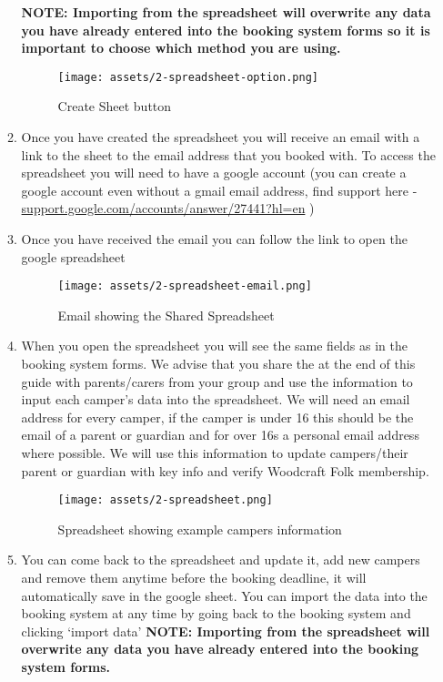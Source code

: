 \documentclass[a4paper, 11pt]{report}
\begin{document}
\begin{enumerate}
\begin{enumerate}
        \textbf{NOTE: Importing from the spreadsheet will overwrite any data you have already entered into the booking system forms so it is important to choose which method you are using.}
        \begin{figure}[H]
            \centering
            \texttt{[image: assets/2-spreadsheet-option.png]}
            \caption{Create Sheet button}
        \end{figure}
        \item Once you have created the spreadsheet you will receive an email with a link to the sheet to the email address that you booked with. To access the spreadsheet you will need to have a google account (you can create a google account even without a gmail email address, find support here - \href{https://support.google.com/accounts/answer/27441?hl=en}{support.google.com/accounts/answer/27441?hl=en} ) 
        \item Once you have received the email you can follow the link to open the google spreadsheet
         \begin{figure}[H]
            \centering
            \texttt{[image: assets/2-spreadsheet-email.png]}
            \caption{Email showing the Shared Spreadsheet}
        \end{figure}
        \item When you open the spreadsheet you will see the same fields as in the booking system forms. We advise that you share the  at the end of this guide with parents/carers from your group and use the information to input each camper's data into the spreadsheet. We will need an email address for every camper, if the camper is under 16 this should be the email of a parent or guardian and for over 16s a personal email address where possible. We will use this information to update campers/their parent or guardian with key info and verify Woodcraft Folk membership.
        \begin{figure}[H]
            \centering
            \texttt{[image: assets/2-spreadsheet.png]}
            \caption{Spreadsheet showing example campers information}
        \end{figure}
        \item You can come back to the spreadsheet and update it, add new campers and remove them anytime before the booking deadline, it will automatically save in the google sheet. You can import the data into the booking system at any time by going back to the booking system and clicking `import data' \textbf{NOTE: Importing from the spreadsheet will overwrite any data you have already entered into the booking system forms.}

\end{enumerate}
\end{enumerate}
\end{document}
